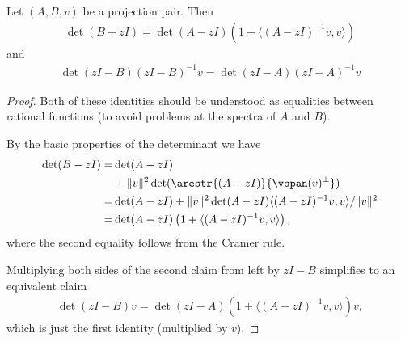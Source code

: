 \begin{lem}\label{projection_characteristic_polynomial}
	Let $(A, B, v)$ be a projection pair. Then
	\begin{align*}
		\det(B - z I) = \det(A - z I) \left(1 + \langle (A - z I)^{-1}v, v\rangle\right)
	\end{align*}
	and
	\begin{align*}
		\det(z I - B) (z I - B)^{-1} v = \det(z I - A) (z I - A)^{-1} v
	\end{align*}
\end{lem}
\begin{proof}
	Both of these identities should be understood as equalities between rational functions (to avoid problems at the spectra of $A$ and $B$).

	By the basic properties of the determinant we have
	\begin{align*}
		\det(B - z I) =& \det(A - z I) \\
		&+ \|v\|^2 \det(\arestr{(A - z I)}{\vspan(v)^{\perp}}) \\
		=& \det(A - z I) + \|v\|^2 \det(A - z I) \langle (A - zI)^{-1} v, v \rangle/\|v\|^2 \\
		=&  \det(A - z I) \left(1 + \langle (A - z I)^{-1}v, v\rangle\right),
	\end{align*}
	where the second equality follows from the Cramer rule.

	Multiplying both sides of the second claim from left by $z I - B$ simplifies to an equivalent claim
	\begin{align*}
	\det(z I - B) v = \det(z I - A) (1 + \langle (A - z I)^{-1} v, v \rangle) v,
	\end{align*}
	which is just the first identity (multiplied by $v$).
\end{proof}

